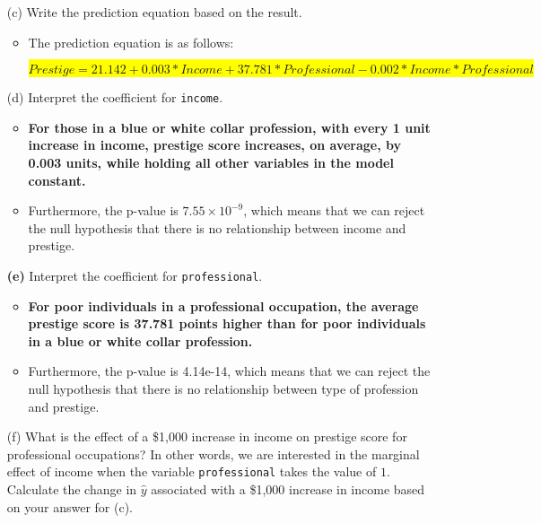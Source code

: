 \documentclass[12pt,letterpaper]{article}
\begin{document}
\begin{enumerate}
\begin{itemize}
\end{itemize}

	\item [(c)]
	Write the prediction equation based on the result.
	
	
\begin{itemize}
	\item The prediction equation is as follows:
	
	\hspace*{-1.5cm} 
	\colorbox{yellow}{$Prestige = 21.142 + 0.003*Income + 37.781*Professional - 0.002*Income*Professional$}
 
\end{itemize}
	
\newpage
	\item [(d)]
	Interpret the coefficient for \texttt{income}.
	
	
\begin{itemize}
	\item \textbf{
			For those in a blue or white collar profession, with every 1 unit increase in income, prestige score increases, on average, by 0.003 units, while holding all other variables in the model constant.
	}
	
	\item Furthermore, the p-value is \(7.55 \times 10^{-9}\), which means that we can reject the null hypothesis that there is no relationship between income and prestige.
\end{itemize}

\textbf{(e)} Interpret the coefficient for \texttt{professional}.


\begin{itemize}
	\item \textbf{For poor individuals in a professional occupation, the average prestige score is 37.781 points higher than for poor individuals in a blue or white collar profession.}
	\item Furthermore, the p-value is 4.14e-14, which means that we can reject the null hypothesis that there is no relationship between type of profession and prestige.
\end{itemize}
	

	\item [(f)]
	What is the effect of a \$1,000 increase in income on prestige score for professional occupations? In other words, we are interested in the marginal effect of income when the variable \texttt{professional} takes the value of $1$. Calculate the change in $\hat{y}$ associated with a \$1,000 increase in income based on your answer for (c).
	

\end{enumerate}
\end{document}

